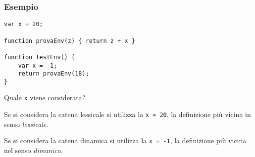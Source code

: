 \subsubsection{Esempio}
\begin{verbatim}
var x = 20;

function provaEnv(z) { return z + x }

function testEnv() {
    var x = -1;
    return provaEnv(18);
}
\end{verbatim}
Quale \texttt{x} viene considerata? 

Se si considera la catena lessicale si utilizza la \texttt{x = 20}, la definizione più vicina in senso \textit{lessicale}.

Se si considera la catena dinamica si utilizza la \texttt{x = -1}, la definizione più vicina nel senso \textit{dimanico}.
















